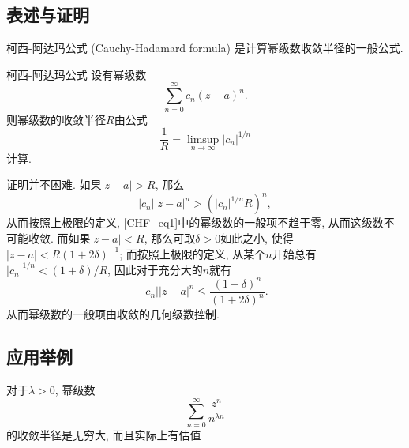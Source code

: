 
\subsection{表述与证明}

柯西-阿达玛公式 (Cauchy-Hadamard formula) 是计算幂级数收敛半径的一般公式.

\begin{theorem}{柯西-阿达玛公式}
设有幂级数
\begin{equation}\label{CHF_eq1}
\sum_{n=0}^\infty c_n(z-a)^n.
\end{equation}
则幂级数的收敛半径$R$由公式
$$
\frac{1}{R}=\limsup_{n\to\infty}|c_n|^{1/n}
$$
计算.
\end{theorem}
证明并不困难. 如果$|z-a|>R$, 那么
$$
|c_n||z-a|^n>(|c_n|^{1/n}R)^n,
$$
从而按照上极限的定义, \autoref{CHF_eq1}中的幂级数的一般项不趋于零, 从而这级数不可能收敛. 而如果$|z-a|<R$, 那么可取$\delta>0$如此之小, 使得$|z-a|<R(1+2\delta)^{-1}$; 而按照上极限的定义, 从某个$n$开始总有$|c_n|^{1/n}<(1+\delta)/R$, 因此对于充分大的$n$就有
$$
|c_n||z-a|^n\leq\frac{(1+\delta)^n}{(1+2\delta)^n}.
$$
从而幂级数的一般项由收敛的几何级数控制.

\subsection{应用举例}
对于$\lambda>0$, 幂级数
$$
\sum_{n=0}^\infty\frac{z^n}{n^{\lambda n}}
$$
的收敛半径是无穷大, 而且实际上有估值